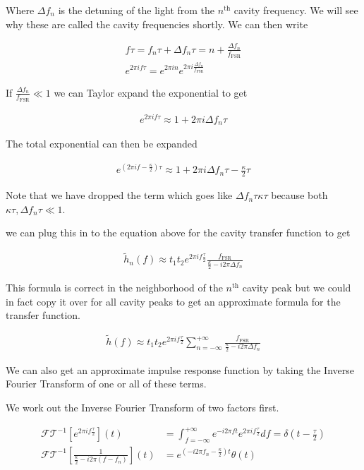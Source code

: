 \documentclass[12pt]{article}
\begin{document}
Where $\Delta f_n$ is the detuning of the light from the $n^{\text{th}}$ cavity frequency. We will see why these are called the cavity frequencies shortly. We can then write

\begin{align}
f \tau = f_n \tau + \Delta f_n \tau = n + \frac{\Delta f_n}{f_{\text{FSR}}}\\
e^{2\pi i f \tau} = e^{2\pi i n} e^{2 \pi i \frac{\Delta f_n}{f_{\text{FSR}}}}
\end{align}

If $\frac{\Delta f_n}{f_{\text{FSR}}} \ll1$ we can Taylor expand the exponential to get

\begin{align}
e^{2\pi i f \tau} \approx 1 + 2\pi i \Delta f_n \tau
\end{align}

The total exponential can then be expanded

\begin{align}
e^{\left(2 \pi i f - \frac{\kappa}{2} \right) \tau} \approx 1 + 2\pi i \Delta f_n \tau - \frac{\kappa}{2} \tau
\end{align}

Note that we have dropped the term which goes like $\Delta f_n \tau \kappa \tau$ because both $\kappa \tau, \Delta f_n \tau \ll 1$.

we can plug this in to the equation above for the cavity transfer function to get

\begin{align}
\tilde{h}_n(f) \approx t_1 t_2 e^{2\pi i f \frac{\tau}{2}} \frac{f_{\text{FSR}}}{\frac{\kappa}{2} - i 2\pi \Delta f_n}
\end{align}

This formula is correct in the neighborhood of the $n^{\text{th}}$ cavity peak but we could in fact copy it over for all cavity peaks to get an approximate formula for the transfer function.

\begin{align}
\tilde{h}(f) \approx t_1 t_2 e^{2\pi i f \frac{\tau}{2}} \sum_{n=-\infty}^{+\infty}\frac{f_{\text{FSR}}}{\frac{\kappa}{2} - i 2\pi \Delta f_n}
\end{align}

We can also get an approximate impulse response function by taking the Inverse Fourier Transform of one or all of these terms.

We work out the Inverse Fourier Transform of two factors first.

\begin{align}
\mathcal{FT}^{-1}\left[e^{2\pi i f \frac{\tau}{2}} \right](t) &= \int_{f=-\infty}^{+\infty} e^{-i2\pi f t} e^{2\pi i f \frac{\tau}{2}} df = \delta\left(t - \frac{\tau}{2}\right)\\
\mathcal{FT}^{-1}\left[\frac{1}{\frac{\kappa}{2} - i 2 \pi (f- f_n)} \right](t) &= e^{\left(-i2 \pi f_n - \frac{\kappa}{2}\right)t}\theta(t)
\end{align}
\end{document}

